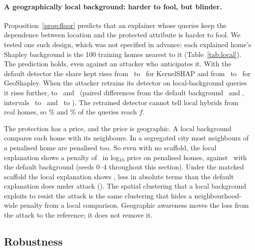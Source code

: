 \paragraph{A geographically local background: harder to fool, but blinder.} Proposition~\ref{prop:floor} predicts that an explainer whose queries keep the dependence between location and the
protected attribute is harder to fool. We tested one such design, which was not specified in advance: each explained
home's Shapley background is the 100 training homes nearest to it (Table~\ref{tab:local}). The prediction holds, even
against an attacker who anticipates it. With the default detector the share kept rises from \MainKernelSHAPKeptLocalTab\ to
\LocalFixedKernelSHAPKept\ for KernelSHAP and from \MainGeoShapleyKeptLocalTab\ to \LocalFixedGeoShapleyKept\ for
GeoShapley. When the attacker retrains its detector on local-background queries it rises further, to
\LocalAdaptedKernelSHAPKept\ and \LocalAdaptedGeoShapleyKept\ (paired differences from the default background
\LocalAdaptedKernelSHAPMinusMain\ and \LocalAdaptedGeoShapleyMinusMain, intervals \LocalAdaptedKernelSHAPMinusMainLo\
to \LocalAdaptedKernelSHAPMinusMainHi\ and \LocalAdaptedGeoShapleyMinusMainLo\ to \LocalAdaptedGeoShapleyMinusMainHi).
The retrained detector cannot tell local hybrids from real homes, so \LocalAdaptedKernelSHAPLeak\% and
\LocalAdaptedGeoShapleyLeak\% of the queries reach $f$.

The protection has a price, and the price is geographic. A local background compares each home with its neighbours.
In a segregated city most neighbours of a penalised home are penalised too. So even with no scaffold, the local
explanation shows a penalty of \LocalFixedKernelSHAPBiasedSigned\ in log$_{10}$ price on penalised homes, against
\MainKernelSHAPBiasedSignedLocalTab\ with the default background (seeds 0--4 throughout this section). Under the matched scaffold the local explanation shows
\LocalAdaptedKernelSHAPMatSignedLocalTab, less in absolute terms than the default explanation does under attack
(\MainKernelSHAPMatSignedLocalTab). The spatial clustering that a local background exploits to resist the attack is
the same clustering that hides a neighbourhood-wide penalty from a local comparison. Geographic awareness moves the
loss from the attack to the reference; it does not remove it.


\subsection{Robustness}
